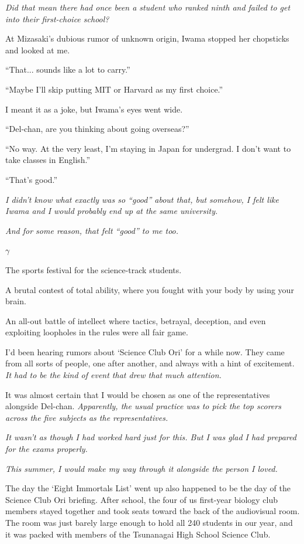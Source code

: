 \documentclass[
    a4paper,
    12pt,
    twoside,
    openany,
    UTF8,
    fontset=windows
]{ctexbook}
\begin{document}
\textit{Did that mean there had once been a student who ranked ninth and failed to get into their first-choice school?}

At Mizasaki's dubious rumor of unknown origin, Iwama stopped her chopsticks and looked at me.

``That... sounds like a lot to carry.''

``Maybe I'll skip putting MIT or Harvard as my first choice.''

I meant it as a joke, but Iwama's eyes went wide.

``Del-chan, are you thinking about going overseas?''

``No way. At the very least, I'm staying in Japan for undergrad. I don't want to take classes in English.''

``That's good.''

\textit{I didn't know what exactly was so ``good'' about that, but somehow, I felt like Iwama and I would probably end up at the same university.}

\textit{And for some reason, that felt ``good'' to me too.}

$\gamma$

The sports festival for the science-track students.

A brutal contest of total ability, where you fought with your body by using your brain.

An all-out battle of intellect where tactics, betrayal, deception, and even exploiting loopholes in the rules were all fair game.

I'd been hearing rumors about `Science Club Ori' for a while now. They came from all sorts of people, one after another, and always with a hint of excitement. \textit{It had to be the kind of event that drew that much attention.}

It was almost certain that I would be chosen as one of the representatives alongside Del-chan. \textit{Apparently, the usual practice was to pick the top scorers across the five subjects as the representatives.}

\textit{It wasn't as though I had worked hard just for this. But I was glad I had prepared for the exams properly.}

\textit{This summer, I would make my way through it alongside the person I loved.}

The day the `Eight Immortals List' went up also happened to be the day of the Science Club Ori briefing. After school, the four of us first-year biology club members stayed together and took seats toward the back of the audiovisual room. The room was just barely large enough to hold all 240 students in our year, and it was packed with members of the Tsunanagai High School Science Club.
\end{document}
